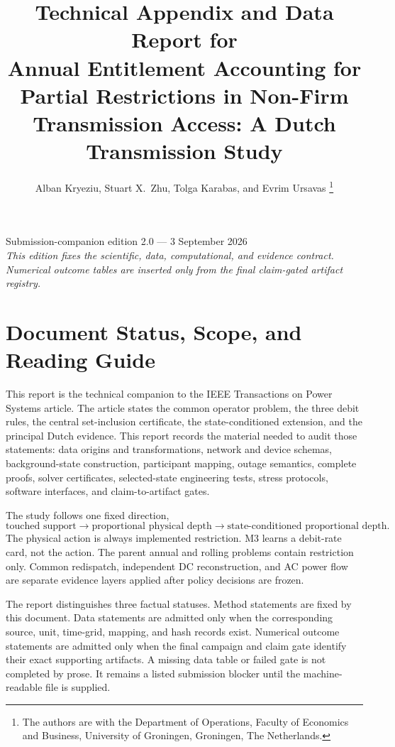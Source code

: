 \documentclass[10pt,journal,onecolumn]{IEEEtran}
\title{Technical Appendix and Data Report for\\
Annual Entitlement Accounting for Partial Restrictions in Non-Firm
Transmission Access: A Dutch Transmission Study}
\author{Alban Kryeziu, Stuart X.~Zhu, Tolga Karabas, and Evrim Ursavas%
\thanks{The authors are with the Department of Operations, Faculty of Economics
and Business, University of Groningen, Groningen, The Netherlands.}}
\begin{document}
\maketitle

\begin{center}
\small
Submission-companion edition 2.0 --- 3 September 2026\\
\textit{This edition fixes the scientific, data, computational, and evidence
contract. Numerical outcome tables are inserted only from the final claim-gated
artifact registry.}
\end{center}

\tableofcontents
\listoftables
\listofalgorithms

\section{Document Status, Scope, and Reading Guide}
\label{sec:report_status}

This report is the technical companion to the IEEE Transactions on Power
Systems article. The article states the common operator problem, the three debit
rules, the central set-inclusion certificate, the state-conditioned extension,
and the principal Dutch evidence. This report records the material needed to
audit those statements: data origins and transformations, network and device
schemas, background-state construction, participant mapping, outage semantics,
complete proofs, solver certificates, selected-state engineering tests, stress
protocols, software interfaces, and claim-to-artifact gates.

The study follows one fixed direction,
\begin{equation}
\text{touched support}
\longrightarrow
\text{proportional physical depth}
\longrightarrow
\text{state-conditioned proportional depth}.
\label{eq:report_story}
\end{equation}
The physical action is always implemented restriction. M3 learns a debit-rate
card, not the action. The parent annual and rolling problems contain restriction
only. Common redispatch, independent DC reconstruction, and AC power flow are
separate evidence layers applied after policy decisions are frozen.

The report distinguishes three factual statuses. Method statements are fixed by
this document. Data statements are admitted only when the corresponding source,
unit, time-grid, mapping, and hash records exist. Numerical outcome statements
are admitted only when the final campaign and claim gate identify their exact
supporting artifacts. A missing data table or failed gate is not completed by
prose. It remains a listed submission blocker until the machine-readable file is
supplied.
\end{document}
